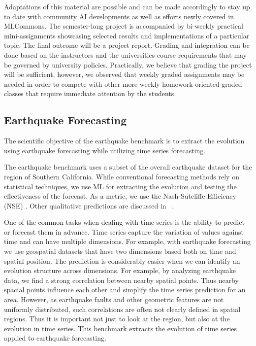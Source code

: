 \documentclass[utf8]{FrontiersinVancouver} %
\begin{document}
 Adaptations of this material are possible and can be made accordingly
 to stay up to date with community AI developments as well as efforts
 newly covered in MLCommons. The semester-long project is accompanied
 by bi-weekly practical mini-assignments showcasing selected results
 and implementations of a particular topic. The final outcome will be a project report. Grading and integration can be done based on the instructors and the universities course requirements that may be governed by university policies. Practically, we believe that grading the project will be sufficient, however, we observed that weekly graded assignments may be needed in order to compete with other more weekly-homework-oriented graded classes that require immediate attention by the students.


\subsection{Earthquake Forecasting}
\label{sec:eq}

The scientific objective of the earthquake benchmark is to extract the
evolution using earthquake forecasting while utilizing time series
forecasting.

The earthquake benchmark uses a subset of the overall earthquake
dataset for the region of Southern California. While conventional
forecasting methods rely on statistical techniques, we use ML for
extracting the evolution and testing the effectiveness of the
forecast.  As a metric, we use the Nash-Sutcliffe Efficiency (NSE)
\citep{nash-79}.  Other qualitative predictions are discussed in
~\citep{fox2022-jm}.

One of the common tasks when dealing with time series is the ability
to predict or forecast them in advance. Time series capture the
variation of values against time and can have multiple dimensions. For
example, with earthquake forecasting we use geospatial datasets that
have two dimensions based both on time and spatial position. The
prediction is considerably easier when we can identify an evolution
structure across dimensions. For example, by analyzing earthquake data, we find a
strong correlation between nearby spatial points. Thus nearby
spacial points influence each other and simplify the time series
prediction for an area. However, as earthquake faults and other
geometric features are not uniformly distributed, such correlations
are often not clearly defined in spatial regions. Thus it is important
not just to look at the region, but also at the evolution in time
series. This benchmark extracts the evolution of time series applied
to earthquake forecasting.
\end{document}

